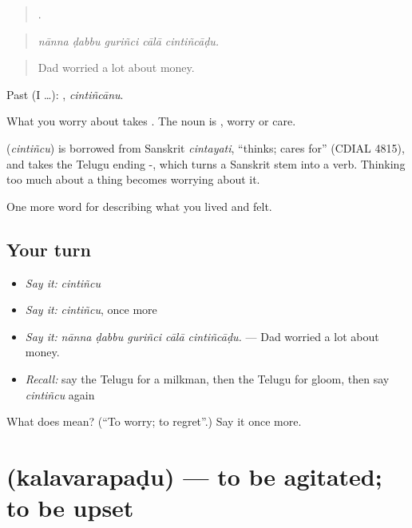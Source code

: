 \begin{quote}
    .
\end{quote}

\begin{quote}
\emph{nānna ḍabbu guriñci cālā cintiñcāḍu.}
\end{quote}

\begin{quote}
Dad worried a lot about money.
\end{quote}

Past (I …): , \emph{cintiñcānu}.

What you worry about takes . The noun is , worry or care.

\begin{cousinweb}
\textbf{} (\emph{cintiñcu}) is borrowed from Sanskrit \emph{cintayati}, \textquotedblleft{}thinks; cares for\textquotedblright{} (CDIAL 4815), and takes the Telugu ending -, which turns a Sanskrit stem into a verb. Thinking too much about a thing becomes worrying about it.
\end{cousinweb}

\begin{grammarlens}[title={What you've built}]
One more word for describing what you lived and felt.
\end{grammarlens}

\subsection*{Your turn}
\begin{itemize}
\raggedright
  \item \emph{Say it:} \emph{cintiñcu}
  \item \emph{Say it:} \emph{cintiñcu}, once more
  \item \emph{Say it:} \emph{nānna ḍabbu guriñci cālā cintiñcāḍu.} — Dad worried a lot about money.
  \item \emph{Recall:} say the Telugu for a milkman, then the Telugu for gloom, then say \emph{cintiñcu} again
\end{itemize}

\begin{tcolorbox}[breakable,colback=teal!4,colframe=teal!35!black,title={Before you move on}]
What does  mean? (\textquotedblleft{}To worry; to regret\textquotedblright{}.) Say it once more.
\end{tcolorbox}
\section[\texorpdfstring{\te{కలవరపడు} (kalavarapaḍu)}{కలవరపడు (kalavarapaḍu)}]{ (kalavarapaḍu) — to be agitated; to be upset}

